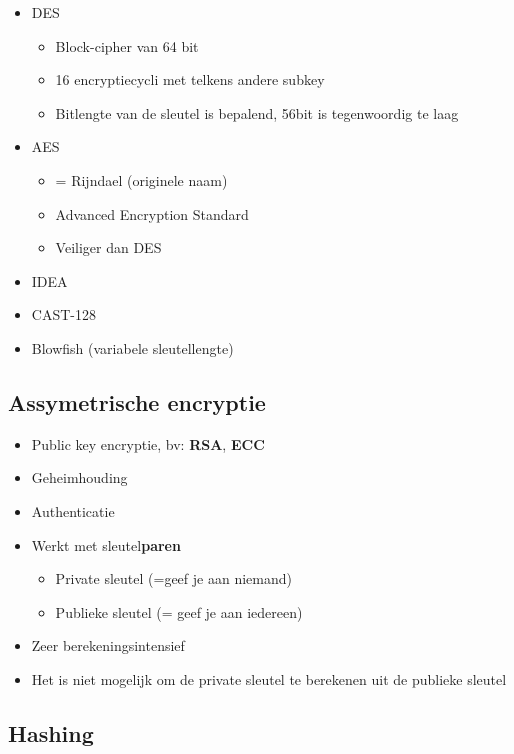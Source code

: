 \documentclass{article}
\newcommand{\bold}[1]{\textbf{#1}}
\begin{document}
\begin{itemize}
    \item DES
    \begin{itemize}
        \item Block-cipher van 64 bit
        \item 16 encryptiecycli met telkens andere subkey
        \item Bitlengte van de sleutel is bepalend, 56bit is tegenwoordig te laag
    \end{itemize}
    \item AES
    \begin{itemize}
        \item = Rijndael (originele naam)
        \item Advanced Encryption Standard
        \item Veiliger dan DES
    \end{itemize}
    \item IDEA
    \item CAST-128
    \item Blowfish (variabele sleutellengte)
\end{itemize}

\subsection{Assymetrische encryptie}

\begin{itemize}
    \item Public key encryptie, bv: \bold{RSA}, \bold{ECC}
    \item Geheimhouding
    \item Authenticatie
    \item Werkt met sleutel\bold{paren}
    \begin{itemize}
        \item Private sleutel (=geef je aan niemand)
        \item Publieke sleutel (= geef je aan iedereen)
    \end{itemize}
    \item Zeer berekeningsintensief
    \item Het is niet mogelijk om de private sleutel te berekenen uit de publieke sleutel
\end{itemize}

\subsection{Hashing}
\end{document}
